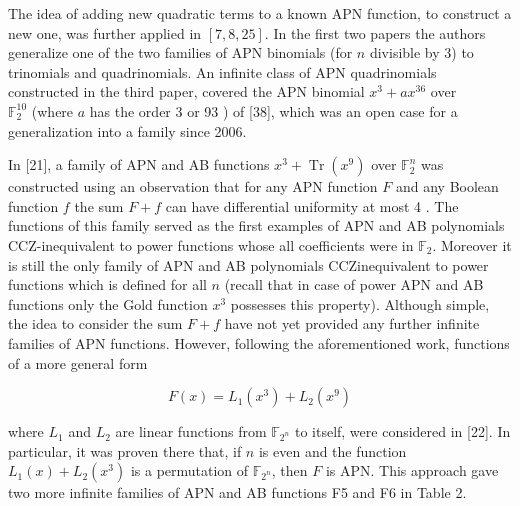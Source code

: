 \documentclass[10pt]{article}
\begin{document}
The idea of adding new quadratic terms to a known APN function, to construct a new one, was further applied in $[7,8,25]$. In the first two papers the authors generalize one of the two families of APN binomials (for $n$ divisible by 3) to trinomials and quadrinomials. An infinite class of APN quadrinomials constructed in the third paper, covered the APN binomial $x^{3}+a x^{36}$ over\\
$\mathbb{F}_{2}^{10}$ (where $a$ has the order 3 or 93 ) of [38], which was an open case for a generalization into a family since 2006.

In [21], a family of APN and AB functions $x^{3}+\operatorname{Tr}\left(x^{9}\right)$ over $\mathbb{F}_{2}^{n}$ was constructed using an observation that for any APN function $F$ and any Boolean function $f$ the sum $F+f$ can have differential uniformity at most 4 . The functions of this family served as the first examples of APN and AB polynomials CCZ-inequivalent to power functions whose all coefficients were in $\mathbb{F}_{2}$. Moreover it is still the only family of APN and AB polynomials CCZinequivalent to power functions which is defined for all $n$ (recall that in case of power APN and AB functions only the Gold function $x^{3}$ possesses this property). Although simple, the idea to consider the sum $F+f$ have not yet provided any further infinite families of APN functions. However, following the aforementioned work, functions of a more general form

$$
F(x)=L_{1}\left(x^{3}\right)+L_{2}\left(x^{9}\right)
$$

where $L_{1}$ and $L_{2}$ are linear functions from $\mathbb{F}_{2^{n}}$ to itself, were considered in [22]. In particular, it was proven there that, if $n$ is even and the function $L_{1}(x)+L_{2}\left(x^{3}\right)$ is a permutation of $\mathbb{F}_{2^{n}}$, then $F$ is APN. This approach gave two more infinite families of APN and AB functions F5 and F6 in Table 2.
\end{document}
